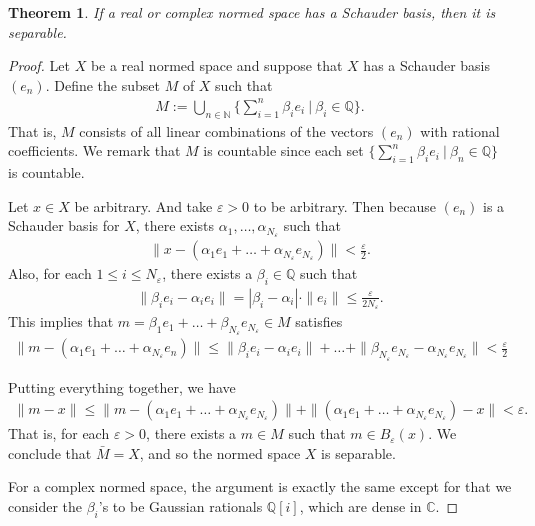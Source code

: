 \documentclass[11pt]{article}
\theoremstyle{mystyle}
\newtheorem{thm}{Theorem}[section]
\newcommand{\0}{\mathbf{0}}
\begin{document}
\begin{thm}
If a real or complex normed space has a Schauder basis, then it is separable.
\end{thm}
\begin{proof}
Let $X$ be a real normed space and suppose that $X$ has a Schauder basis $(e_n)$. Define the subset $M$ of $X$ such that 
\begin{align*}
    M := \bigcup_{n \in \mathbb{N}} \bigg\{ \sum_{i=1}^n \beta_i e_i  \ | \ \beta_i \in \mathbb{Q} \bigg\}.
\end{align*}
That is, $M$ consists of all linear combinations of the vectors $(e_n)$ with rational coefficients. We remark that $M$ is countable since each set $\{ \sum_{i=1}^n \beta_i e_i  \ | \ \beta_n \in \mathbb{Q} \}$ is countable.

Let $x \in X$ be arbitrary. And take $\varepsilon > 0$ to be arbitrary. Then because $(e_n)$ is a Schauder basis for $X$, there exists $\alpha_1, \ldots, \alpha_{N_{\varepsilon}}$ such that
\begin{align*}
    \|x - (\alpha_1 e_1 + \ldots + \alpha_{N_{\varepsilon}}e_{N_{\varepsilon}})\| < \frac{\varepsilon}{2}.
\end{align*}
Also, for each $1 \leq i \leq N_{\varepsilon}$, there exists a $\beta_i \in \mathbb{Q}$ such that 
\begin{align*}
    \|\beta_ie_i - \alpha_i e_i\| = |\beta_i - \alpha_i| \cdot \|e_i\| \leq \frac{\varepsilon}{2N_{\varepsilon}}.
\end{align*}
This implies that $m = \beta_1 e_1 + \ldots + \beta_{N_{\varepsilon}} e_{N_{\varepsilon}} \in M$ satisfies
\begin{align*}
    \|m - (\alpha_1 e_1 + \ldots + \alpha_{N_{\varepsilon}}e_n)\| \leq \|\beta_ie_i - \alpha_i e_i\| + \ldots + \|\beta_{N_{\varepsilon}} e_{N_{\varepsilon}} - \alpha_{N_{\varepsilon}} e_{N_{\varepsilon}}\| < \frac{\varepsilon}{2}
\end{align*}

Putting everything together, we have 
\begin{align*}
    \|m - x\| \leq \|m - (\alpha_1 e_1 + \ldots + \alpha_{N_{\varepsilon}}e_{N_{\varepsilon}})\| + \|(\alpha_1 e_1 + \ldots + \alpha_{N_{\varepsilon}}e_{N_{\varepsilon}}) - x\| < \varepsilon.
\end{align*}
That is, for each $\varepsilon > 0$, there exists a $m \in M$ such that $m \in B_{\varepsilon}(x)$. We conclude that $\bar{M} = X$, and so the normed space $X$ is separable.

For a complex normed space, the argument is exactly the same except for that we consider the $\beta_i$'s to be Gaussian rationals $\mathbb{Q}[i]$, which are dense in $\mathbb{C}$.
\end{proof}
\end{document}
